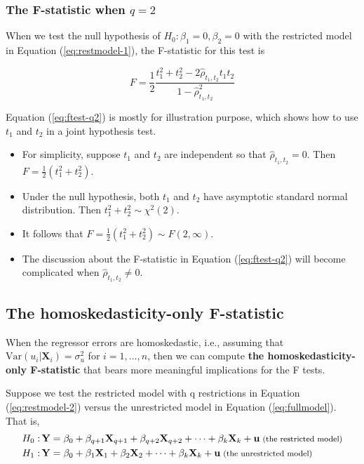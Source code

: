 \documentclass[a4paper,11pt]{article}
\newcommand{\var}{\mathrm{Var}}
\begin{document}
\subsubsection*{The F-statistic when \(q=2\)}
\label{sec:orgb6d858b}

When we test the null hypothesis of \(H_0: \beta_1 = 0, \beta_2 = 0\)
with the restricted model in Equation (\ref{eq:restmodel-1}), the
F-statistic for this test is

\begin{equation}
\label{eq:ftest-q2}
F = \frac{1}{2}\frac{t_1^2 + t_2^2 - 2 \hat{\rho}_{t_1,t_2}t_1t_2}{1 - \hat{\rho}_{t_1,t_2}^2}
\end{equation}

Equation (\ref{eq:ftest-q2}) is mostly for illustration purpose, which
shows how to use \(t_1\) and \(t_2\) in a joint hypothesis test.
\begin{itemize}
\item For simplicity, suppose \(t_1\) and \(t_2\) are independent so that
\(\hat{\rho}_{t_1,t_2} = 0\). Then \(F = \frac{1}{2}(t_1^2 +
  t_2^2)\).
\item Under the null hypothesis, both \(t_1\) and \(t_2\) have asymptotic
standard normal distribution. Then \(t^2_1 + t^2_2 \sim \chi^2(2)\).
\item It follows that \(F = \frac{1}{2}(t^2_1 + t^2_2) \sim F(2, \infty)\).
\item The discussion about the F-statistic in Equation (\ref{eq:ftest-q2})
will become complicated when \(\hat{\rho}_{t_1,t_2} \neq 0\).
\end{itemize}


\subsection{The homoskedasticity-only F-statistic}
\label{sec:orgced4635}

When the regressor errors are homoskedastic, i.e., assuming that
\(\var(u_i | \mathbf{X}_i) = \sigma^2_u\) for \(i = 1, \ldots,
n\), then we can compute \textbf{the homoskedasticity-only F-statistic} that
bears more meaningful implications for the F tests.

Suppose we test the restricted model with q restrictions in Equation
(\ref{eq:restmodel-2}) versus the unrestricted model in Equation
(\ref{eq:fullmodel}). That is,
\begin{align*}
H_0:\, &  \mathbf{Y} = \beta_0 + \beta_{q+1} \mathbf{X}_{q+1} + \beta_{q+2} \mathbf{X}_{q+2} + \cdots + \beta_k \mathbf{X}_k + \mathbf{u} \text{\footnotesize{ (the restricted model)}} \\
H_1:\, &  \mathbf{Y} = \beta_0 + \beta_{1} \mathbf{X}_{1} + \beta_{2} \mathbf{X}_{2} + \cdots + \beta_k \mathbf{X}_k + \mathbf{u} \text{\footnotesize{ (the unrestricted model)}}
\end{align*}
\end{document}
